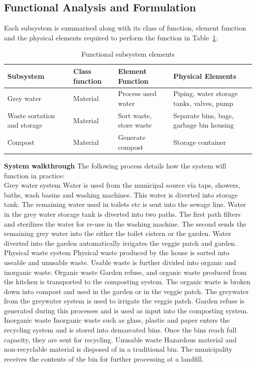 \documentclass[a4paper,11pt,fleqn]{report}
\begin{document}
\subsection{Functional Analysis and Formulation} 
Each subsystem is summarised along with its class of function, element function and the physical elements required to perform the function in Table~\ref{tb: Functional_SS_elements}.
%
\begin{table}[h!]
\caption {Functional subsystem elements} \label{tb: Functional_SS_elements} 
\begin{center}
\begin{tabular}{p{4cm}|p{4cm}|p{4cm}|p{4cm}}\toprule
	{\textbf{Subsystem}} & {\textbf{Class function}} & {\textbf{Element Function}} & {\textbf{Physical Elements}}\\ \midrule
    Grey water & Material & Process used water & Piping, water storage tanks, valves, pump\\
    \hline
    Waste sortation and storage & Material & Sort waste, store waste & Separate bins, bags, garbage bin housing\\
    \hline
        Compost & Material & Generate compost & Storage container\\
    \bottomrule
\end{tabular}
\end{center}
\end{table}
%
\textbf{System walkthrough}
The following process details how the system will function in practice:\\

Grey water system
Water is used from the municipal source via taps, showers, baths, wash basins and washing machines. This water is diverted into storage tank. The remaining water used in toilets etc is sent into the sewage line.
Water in the grey water storage tank is diverted into two paths.
The first path filters and sterilizes the water for re-use in the washing machine.
The second sends the remaining grey water into the either the toilet cistern or the garden.
Water diverted into the garden automatically irrigates the veggie patch and garden.
Physical waste system
Physical waste produced by the house is sorted into useable and unusable waste.
Usable waste is further divided into organic and inorganic waste.
Organic waste
Garden refuse, and organic waste produced from the kitchen is transported to the composting system.
The organic waste is broken down into compost and used in the garden or in the veggie patch.
The greywater from the greywater system is used to irrigate the veggie patch.
Garden refuse is generated during this processes and is used as input into the composting system.
Inorganic waste
Inorganic waste such as glass, plastic and paper enters the recycling system and is stored into demarcated bins.
Once the bins reach full capacity, they are sent for recycling.
Unusable waste
Hazardous material and non-recyclable material is disposed of in a traditional bin.
The municipality receives the contents of the bin for further processing at a landfill.
\end{document}
